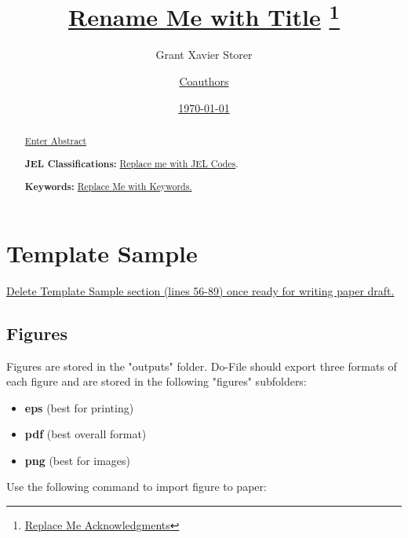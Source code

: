 \documentclass[12pt]{article}
\title
{
	\underline{Rename Me with Title}
	\thanks
	{
		\noindent \underline{Replace Me Acknowledgments}
	}
}%
\author
{
	Grant Xavier Storer 
	\and 
	\underline{Coauthors}
}%
\date
{
	\underline{\today}
}%
\begin{document}
\maketitle%


\begin{abstract}
\underline{Enter Abstract}

\bigskip

\noindent 	\textbf{JEL Classifications:} 
			\underline{Replace me with JEL Codes}.

\noindent 	\textbf{Keywords:} 
			\underline{ Replace Me with Keywords.}
\end{abstract}

\bigskip \pagebreak


\section{Template Sample}

\underline
{
	Delete Template Sample section (lines 56-89) 
	once ready for writing paper draft.
}

\subsection{Figures}

Figures are stored in the "outputs" folder. 
Do-File should export three formats of each figure and 
are stored in the following "figures" subfolders:

\begin{itemize}
	\item \textbf{eps} (best for printing)
	\item \textbf{pdf} (best overall format)
	\item \textbf{png} (best for images)
\end{itemize}


Use the following command to import figure to paper: 
\end{document}
